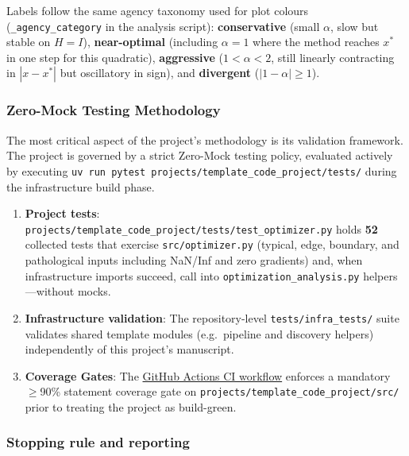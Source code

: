 \documentclass[
]{article}
\providecommand{\tightlist}{%
  \setlength{\itemsep}{0pt}\setlength{\parskip}{0pt}}
\begin{document}
Labels follow the same agency taxonomy used for plot colours
(\texttt{\_agency\_category} in the analysis script):
\textbf{conservative} (small \(\alpha\), slow but stable on \(H=I\)),
\textbf{near-optimal} (including \(\alpha=1\) where the method reaches
\(x^\ast\) in one step for this quadratic), \textbf{aggressive}
(\(1 < \alpha < 2\), still linearly contracting in \(|x-x^\ast|\) but
oscillatory in sign), and \textbf{divergent} (\(|1-\alpha| \geq 1\)).

\subsubsection{Zero-Mock Testing
Methodology}\label{zero-mock-testing-methodology}

The most critical aspect of the project's methodology is its validation
framework. The project is governed by a strict Zero-Mock testing policy,
evaluated actively by executing
\texttt{uv\ run\ pytest\ projects/template\_code\_project/tests/} during
the infrastructure build phase.

\begin{enumerate}
\def\labelenumi{\arabic{enumi}.}
\tightlist
\item
  \textbf{Project tests}:
  \texttt{projects/template\_code\_project/tests/test\_optimizer.py}
  holds \textbf{52} collected tests that exercise
  \texttt{src/optimizer.py} (typical, edge, boundary, and pathological
  inputs including NaN/Inf and zero gradients) and, when infrastructure
  imports succeed, call into \texttt{optimization\_analysis.py}
  helpers---without mocks.
\item
  \textbf{Infrastructure validation}: The repository-level
  \texttt{tests/infra\_tests/} suite validates shared template modules
  (e.g.~pipeline and discovery helpers) independently of this project's
  manuscript.
\item
  \textbf{Coverage Gates}: The
  \href{https://github.com/docxology/template/blob/main/.github/workflows/ci.yml}{GitHub
  Actions CI workflow} enforces a mandatory \texorpdfstring{\ensuremath{\geq}}{>=}90\% statement coverage
  gate on \texttt{projects/template\_code\_project/src/} prior to
  treating the project as build-green.
\end{enumerate}

\subsubsection{Stopping rule and
reporting}\label{stopping-rule-and-reporting}
\end{document}
